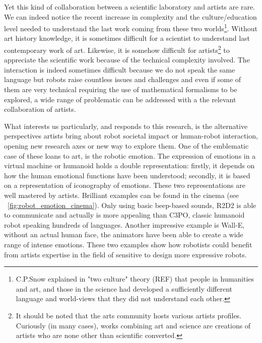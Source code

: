 \begin{figure}[!t]
\centering
    \hfil
    \caption{}
    \label{fig:ergo_robot}
\end{figure}


Yet this kind of collaboration between a scientific laboratory and artists are rare.
We can indeed notice the recent increase in complexity and the culture/education level needed to understand the last work coming from these two worlds\footnote{C.P.Snow explained in "two culture" theory (REF) that people in humanities and art, and those in the science had developed a sufficiently different language and world-views that they did not understand each other.}. Without art history knowledge, it is sometimes difficult for a scientist to understand last contemporary work of art. Likewise, it is somehow difficult for artists\footnote{It should be noted that the arts community hosts various artists profiles. Curiously (in many cases), works combining art and science are creations of artists who are none other than scientific converted.} to appreciate the scientific work because of the technical complexity involved.
The interaction is indeed sometimes difficult because we do not speak the same language but robots raise countless issues and challenges and even if some of them are very technical requiring the use of mathematical formalisms to be explored, a wide range of problematic can be addressed with a the relevant collaboration of artists.

What interests us particularly, and responds to this research, is the alternative perspectives artists bring about robot societal impact or human-robot interaction, opening new research axes or new way to explore them.
One of the emblematic case of these loans to art, is the robotic emotion. The expression of emotions in a virtual machine or humanoid holds a double representation: firstly, it depends on how the human emotional functions have been understood; secondly, it is based on a representation of iconography of emotions. These two representations are well mastered by artists. Brilliant examples can be found in the cinema (see \figurename~\ref{fig:robot_emotion_cinema}). Only using basic beep-based sounds, R2D2 is able to communicate and actually is more appealing than C3PO, classic humanoid robot speaking hundreds of languages. Another impressive example is Wall-E, without an actual human face, the animators have been able to create a wide range of intense emotions.
These two examples show how robotists could benefit from artists expertise in the field of sensitive to design more expressive robots.


